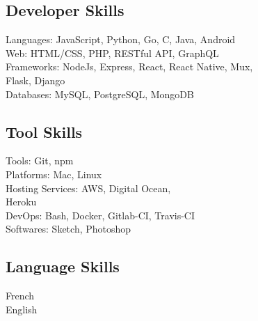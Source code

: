\documentclass[a4paper]{deedy-resume} %
\begin{document}
\begin{minipage}[t]{0.55\textwidth}

\subsection{Developer Skills}

\textbullet{} Languages: JavaScript, Python, Go, C, Java, Android \\
\textbullet{} Web: HTML/CSS, PHP, RESTful API, GraphQL \\
\textbullet{} Frameworks: NodeJs, Express, React, React Native, Mux, \\  Flask, Django \\
\textbullet{} Databases: MySQL, PostgreSQL, MongoDB

\end{minipage}
\begin{minipage}[t]{0.39\textwidth}

\subsection{Tool Skills}

\textbullet{} Tools: Git, npm \\
\textbullet{} Platforms: Mac, Linux \\
\textbullet{} Hosting Services: AWS, Digital Ocean, \\
Heroku \\
\textbullet{} DevOps: Bash, Docker, Gitlab-CI, Travis-CI \\
\textbullet{} Softwares: Sketch, Photoshop
\end{minipage}

\begin{minipage}[t]{0.29\textwidth}

\insectionspace 
\sectionspace
\subsection{Language Skills}

French\\
English

\end{minipage}

\sectionspace %


\end{document}
